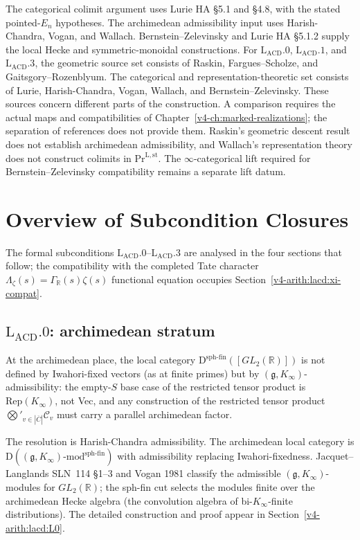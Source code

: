 The categorical colimit argument uses Lurie HA \S5.1 and \S4.8,
with the stated pointed-\(E_{n}\) hypotheses. The archimedean
admissibility input uses Harish-Chandra, Vogan, and Wallach.
Bernstein--Zelevinsky and Lurie HA \S5.1.2 supply the local Hecke
and symmetric-monoidal constructions. For
\(\mathrm{L}_{\mathrm{ACD}}.0\),
\(\mathrm{L}_{\mathrm{ACD}}.1\), and
\(\mathrm{L}_{\mathrm{ACD}}.3\), the geometric source set consists
of Raskin, Fargues--Scholze, and Gaitsgory--Rozenblyum.
The categorical and representation-theoretic set consists of Lurie,
Harish-Chandra, Vogan, Wallach, and Bernstein--Zelevinsky.
These sources concern different parts of the construction. A comparison
requires the actual maps and compatibilities of
Chapter~\ref{v4-ch:marked-realizations}; the separation of references
does not provide them. Raskin's geometric descent
result does not establish archimedean admissibility, and Wallach's
representation theory does not construct colimits in
\(\mathrm{Pr}^{\mathrm{L,st}}\). The \(\infty\)-categorical lift
required for Bernstein--Zelevinsky compatibility remains a separate
lift datum.

\section{Overview of Subcondition Closures}
\label{v4-arith:lacd:table}

The formal subconditions \(\mathrm{L}_{\mathrm{ACD}}.0\)--\(\mathrm{L}_{\mathrm{ACD}}.3\)
are analysed in the four sections that follow; the compatibility
with the completed Tate character
\(\Lambda_{\zeta}(s) = \Gamma_{\mathbb{R}}(s)\zeta(s)\)
functional equation occupies Section~\ref{v4-arith:lacd:xi-compat}.

\subsection{\(\mathrm{L}_{\mathrm{ACD}}.0\): archimedean stratum}

At the archimedean place, the local category
\(\mathrm{D}^{\mathrm{sph\text{-}fin}}([GL_{2}(\mathbb{R})])\)
is not defined by Iwahori-fixed vectors (as at finite primes) but by
\((\mathfrak{g}, K_{\infty})\)-admissibility: the empty-\(S\) base case
of the restricted tensor product is \(\mathrm{Rep}(K_{\infty})\), not Vec,
and any construction of the restricted tensor product
\(\bigotimes'_{v \in |\overline{C}|}\mathcal{C}_{v}\) must carry a
parallel archimedean factor.

The resolution is Harish-Chandra admissibility. The archimedean local
category is \(\mathrm{D}((\mathfrak{g}, K_{\infty})\text{-mod}^{\mathrm{sph\text{-}fin}})\)
with admissibility replacing Iwahori-fixedness.
Jacquet--Langlands SLN~114 \S1--3 and Vogan 1981 classify the admissible
\((\mathfrak{g}, K_{\infty})\)-modules for \(GL_{2}(\mathbb{R})\); the
sph-fin cut selects the modules finite over the archimedean Hecke algebra
(the convolution algebra of bi-\(K_{\infty}\)-finite distributions).
The detailed construction and proof appear in Section~\ref{v4-arith:lacd:L0}.

